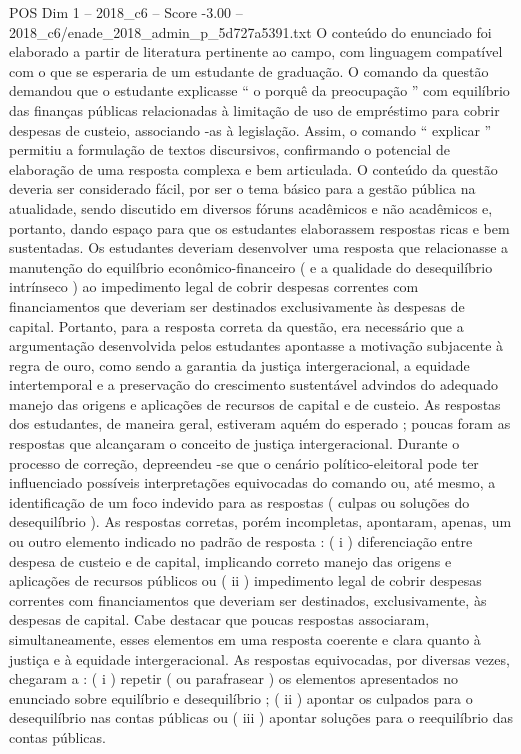 \begin{textsample}{POS Dim 1 – 2018\_c6 – Score -3.00 – 2018\_c6/enade\_2018\_admin\_p\_5d727a5391.txt}
O conteúdo do enunciado foi elaborado a partir de literatura pertinente ao campo, com linguagem compatível com o que se esperaria de um estudante de graduação.
O comando da questão demandou que o estudante explicasse “ o porquê da preocupação ” com equilíbrio das finanças públicas relacionadas à limitação de uso de empréstimo para cobrir despesas de custeio, associando -as à legislação.
Assim, o comando “ explicar ” permitiu a formulação de textos discursivos, confirmando o potencial de elaboração de uma resposta complexa e bem articulada.
O conteúdo da questão deveria ser considerado fácil, por ser o tema básico para a gestão pública na atualidade, sendo discutido em diversos fóruns acadêmicos e não acadêmicos e, portanto, dando espaço para que os estudantes elaborassem respostas ricas e bem sustentadas.
Os estudantes deveriam desenvolver uma resposta que relacionasse a manutenção do equilíbrio econômico-financeiro ( e a qualidade do desequilíbrio intrínseco ) ao impedimento legal de cobrir despesas correntes com financiamentos que deveriam ser destinados exclusivamente às despesas de capital.
Portanto, para a resposta correta da questão, era necessário que a argumentação desenvolvida pelos estudantes apontasse a motivação subjacente à regra de ouro, como sendo a garantia da justiça intergeracional, a equidade intertemporal e a preservação do crescimento sustentável advindos do adequado manejo das origens e aplicações de recursos de capital e de custeio.
As respostas dos estudantes, de maneira geral, estiveram aquém do esperado ; poucas foram as respostas que alcançaram o conceito de justiça intergeracional.
Durante o processo de correção, depreendeu -se que o cenário político-eleitoral pode ter influenciado possíveis interpretações equivocadas do comando ou, até mesmo, a identificação de um foco indevido para as respostas ( culpas ou soluções do desequilíbrio ).
As respostas corretas, porém incompletas, apontaram, apenas, um ou outro elemento indicado no padrão de resposta : ( i ) diferenciação entre despesa de custeio e de capital, implicando correto manejo das origens e aplicações de recursos públicos ou ( ii ) impedimento legal de cobrir despesas correntes com financiamentos que deveriam ser destinados, exclusivamente, às despesas de capital.
Cabe destacar que poucas respostas associaram, simultaneamente, esses elementos em uma resposta coerente e clara quanto à justiça e à equidade intergeracional.
As respostas equivocadas, por diversas vezes, chegaram a : ( i ) repetir ( ou parafrasear ) os elementos apresentados no enunciado sobre equilíbrio e desequilíbrio ; ( ii ) apontar os culpados para o desequilíbrio nas contas públicas ou ( iii ) apontar soluções para o reequilíbrio das contas públicas.

\end{textsample}
